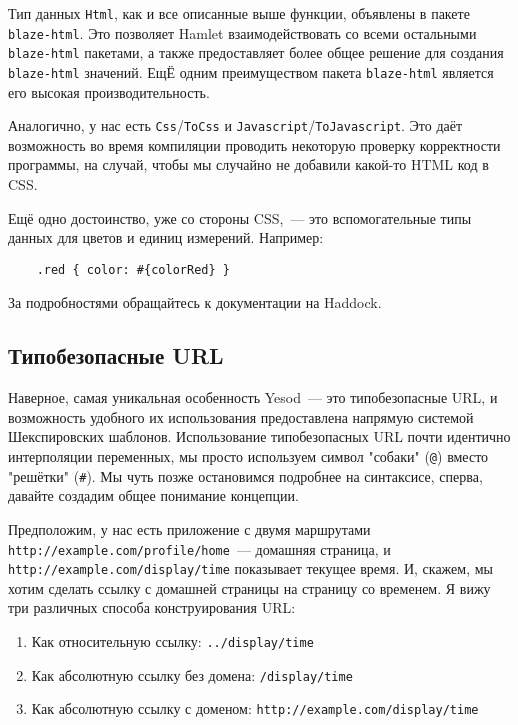 \begin{remark}
    Тип данных \lstinline!Html!, как и все описанные выше функции, объявлены в
    пакете \texttt{blaze-html}. Это позволяет Hamlet взаимодействовать
    со всеми остальными \texttt{blaze-html} пакетами, а также предоставляет
    более общее решение для создания \texttt{blaze-html} значений.  ЕщЁ одним
    преимуществом пакета \texttt{blaze-html} является его высокая
    производительность.
\end{remark}

Аналогично, у нас есть \lstinline!Css!/\lstinline!ToCss! и
\lstinline!Javascript!/\lstinline!ToJavascript!. Это даёт возможность во время
компиляции проводить некоторую проверку корректности программы, на случай,
чтобы  мы случайно не добавили какой-то HTML код в CSS.

\begin{remark}
    Ещё одно достоинство, уже со стороны CSS,~--- это вспомогательные
    типы данных для цветов и единиц измерений. Например:

    \begin{lstlisting}
    .red { color: #{colorRed} }
    \end{lstlisting}

    За подробностями обращайтесь к документации на Haddock.
\end{remark}

\subsection{Типобезопасные URL}
Наверное, самая уникальная особенность Yesod~--- это типобезопасные URL, и
возможность удобного их использования предоставлена напрямую системой
Шекспировских шаблонов.  Использование типобезопасных URL почти идентично
интерполяции переменных, мы просто используем символ "собаки" (\lstinline'@')
вместо "решётки" (\lstinline'#').  Мы чуть позже остановимся подробнее на
синтаксисе, сперва, давайте создадим общее понимание концепции.

Предположим, у нас есть приложение с двумя маршрутами
\texttt{http://example.com/profile/home}~--- домашняя страница, и
\texttt{http://example.com/display/time} показывает текущее время.  И, скажем,
мы хотим сделать ссылку с домашней страницы на страницу со временем.  Я вижу
три различных способа конструирования URL:
\begin{enumerate}
  \item Как относительную ссылку: \texttt{../display/time}
  \item Как абсолютную ссылку без домена: \texttt{/display/time}
  \item Как абсолютную ссылку с доменом: \texttt{http://example.com/display/time}
\end{enumerate}

